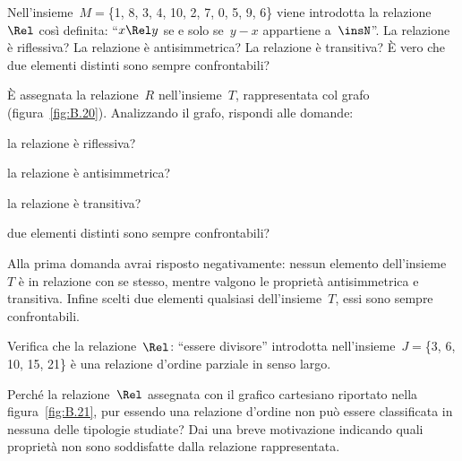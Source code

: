 
\begin{multicols}{2}
\begin{esercizio}
\label{ese:B.44}
Nell'insieme~$M =$\{1, 8, 3, 4, 10, 2, 7, 0, 5, 9, 6\} viene introdotta la 
relazione~$\Rel$ così definita: ``$x \Rel y$ se e solo se~$y-x$ appartiene 
a~$\insN$''.
La relazione è riflessiva? La relazione è antisimmetrica? La relazione è 
transitiva? È vero che due elementi distinti sono sempre confrontabili?
\end{esercizio}

\begin{esercizio}
\label{ese:B.45}
È assegnata la relazione~$R$ nell'insieme~$T$, rappresentata col grafo 
(figura~\ref{fig:B.20}).
Analizzando il grafo, rispondi alle domande:
\begin{itemize*}
\item la relazione è riflessiva?
\item la relazione è antisimmetrica?
\item la relazione è transitiva?
\item due elementi distinti sono sempre confrontabili?
\end{itemize*}
Alla prima domanda avrai risposto negativamente: nessun elemento 
dell'insieme~$T$ è in relazione con se stesso, mentre valgono le proprietà 
antisimmetrica e transitiva.
Infine scelti due elementi qualsiasi dell'insieme~$T$, essi sono sempre 
confrontabili.
\end{esercizio}

\begin{esercizio}
\label{ese:B.46}
Verifica che la relazione~$\Rel$: ``essere divisore'' introdotta 
nell'insieme~$J =$\{3, 6, 10, 15, 21\} è una relazione d'ordine parziale in 
senso largo.
\end{esercizio}

\begin{esercizio}
\label{ese:B.47}
Perché la relazione~$\Rel$ assegnata con il grafico cartesiano riportato 
nella figura~\ref{fig:B.21}, pur essendo una relazione d'ordine non può essere
classificata in nessuna delle tipologie studiate? Dai una breve motivazione 
indicando quali proprietà non sono soddisfatte dalla relazione rappresentata.


\end{esercizio}
\end{multicols}
